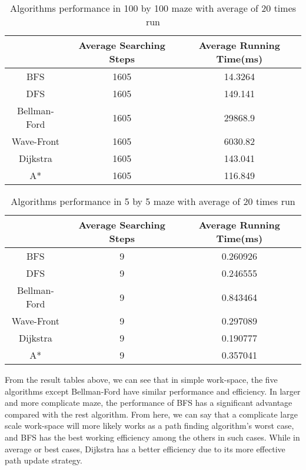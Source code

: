 \documentclass[11pt, onecolumn, letterpaper]{article}
\begin{document}
\begin{table}[htbp]
\begin{center}
\begin{tabular}{|c| c c|}
\hline
 & Average Searching Steps & Average Running Time(ms)\\
\hline
BFS & 1605 & 14.3264\\
DFS & 1605 & 149.141\\
Bellman-Ford & 1605 & 29868.9\\
Wave-Front & 1605 & 6030.82\\
Dijkstra & 1605 & 143.041\\
A* & 1605 & 116.849\\
\hline
\end{tabular}
\end{center}
\caption{Algorithms performance in 100 by 100 maze with average of 20 times run}
\end{table}

\begin{table}[htbp]
\begin{center}
\begin{tabular}{|c| c c|}
\hline
 & Average Searching Steps & Average Running Time(ms)\\
\hline
BFS & 9 & 0.260926\\
DFS & 9 & 0.246555\\
Bellman-Ford & 9 & 0.843464\\
Wave-Front & 9 & 0.297089\\
Dijkstra & 9 & 0.190777\\
A* & 9 & 0.357041\\
\hline
\end{tabular}
\end{center}
\caption{Algorithms performance in 5 by 5 maze with average of 20 times run}
\end{table}

From the result tables above, we can see that in simple work-space, the five algorithms except Bellman-Ford have similar performance and efficiency. In larger and more complicate maze, the performance of BFS has a significant advantage compared with the rest algorithm. From here, we can say that a complicate large scale work-space will more likely works as a path finding algorithm's worst case, and BFS has the best working efficiency among the others in such cases. While in average or best cases, Dijkstra has a better efficiency due to its more effective path update strategy.
\end{document}
